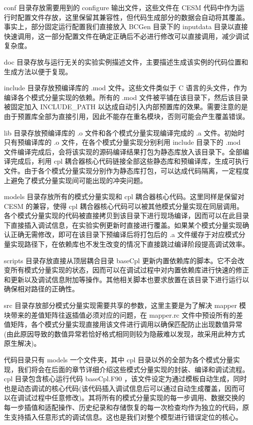 conf 目录存放需要用到的 configure 输出文件，这些文件在 CESM 代码中作为运行时配置文件存放，这里保留其兼容性，但代码生成部分的数据会自动将其覆盖。事实上，部分固定运行配置我们直接放入 BCGen 目录下的 inputdata 目录以直接快速调用，这一部分配置文件在确定正确后不必进行修改可以直接调用，减少调试复杂度。

doc 目录存放与运行无关的实验实例描述文件，主要描述生成该实例的代码位置和生成方法以便于复现。

include 目录存放预编译库的 .mod 文件。这些文件类似于 C 语言的头文件，作为编译各个模式分量实现的依赖。所有的 .mod 文件被平铺在该目录下，然后该目录被固定加入 INCLUDE\_PATH 以达成自动引入内部预置库的效果。需要注意的是由于预置库全部为直接引用，因此不能存在重名模块，否则可能会产生覆盖错误。

lib 目录存放预编译库的 .o 文件和各个模式分量实现编译完成的 .a 文件。初始时只有预编译库的 .o 文件，在各个模式分量实现分别利用 include 目录下的 .mod 文件编译完成后，会将该实现的源码编译结果打包为静态库放入该目录下。全部编译完成后，利用 cpl 耦合器核心代码链接全部这些静态库和预编译库，生成可执行文件。由于各个模式分量实现分别作为静态库打包，可以达成代码隔离，一定程度上避免了模式分量实现间可能出现的冲突问题。

models 目录存放所有的模式分量实现和 cpl 耦合器核心代码。这里同样是保留对 CESM 的兼容，使得 cpl 耦合器核心代码可以被其他模式分量实现在同层调用。各个模式分量实现的代码被直接拷贝到该目录下进行现场编译，因而可以在此目录下直接插入调试信息，在实验实例更新时直接进行覆盖。如果某个模式分量实现确认正确无需修改，即可在该目录下预编译后将打包后的 .a 文件缓存于对应模式分量实现路径下，在依赖库也不发生改变的情况下直接跳过编译阶段提高调试效率。

scripts 目录存放直接从顶层耦合目录 baseCpl 更新内置依赖库的脚本。它不会改变所有模式分量实现的状态，因而可以在调试过程中对内置依赖库进行快速的修正和更新以及调试信息附加等操作。其他相关脚本也要求放置在该目录下进行运行以确保相对路径的正确性。

src 目录存放部分模式分量实现需要共享的参数，这里主要是为了解决 mapper 模块带来的差值矩阵往返插值必须对应的问题，在 mapper.rc 文件中预设所有的差值矩阵，各个模式分量实现直接用该文件进行调用以确保匹配防止出现数值异常(由此原因导致的数值异常若恰好格式相同则较为隐蔽难以发现，故采用此种方式原生解决)。

代码目录只有 models 一个文件夹，其中 cpl 目录以外的全部为各个模式分量实现，我们将会在后面的章节详细介绍这些模式分量实现的封装、编译和调试流程。 cpl 目录包含核心运行代码 baseCpl.F90 ，该文件设定为通过模板自动生成，同时也是动态调试的核心代码(该代码插入调试信息后可以通过自动生成覆盖，因而可以在调试过程中任意修改)。其将所有的模式分量实现的每一步调用、数据交换的每一步插值和适配操作、历史纪录和存储恢复的每一次检查均作为独立的代码，原生支持插入任意形式的调试信息。这也是我们对整个模型进行错误定位的核心。